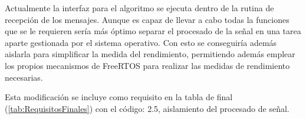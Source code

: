         Actualmente la interfaz para el algoritmo se ejecuta dentro de la rutina de recepción de los mensajes. Aunque es capaz de llevar a cabo todas la funciones que se le requieren sería más óptimo separar el procesado de la señal en una tarea aparte gestionada por el sistema operativo. Con esto se conseguiría además aislarla para simplificar la medida del rendimiento, permitiendo además emplear los propios mecanismos de FreeRTOS \cite{FreeRTOS} para realizar las medidas de rendimiento necesarias.
        
        Esta modificación se incluye como requisito en la tabla de final (\ref{tab:RequisitosFinales}) con el código: 2.5, aislamiento del procesado de señal.